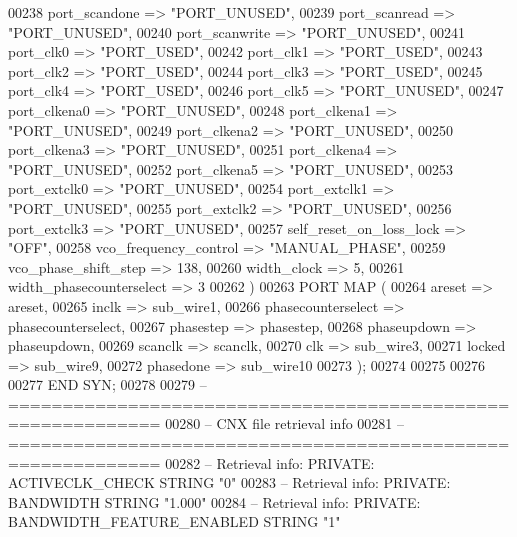 \begin{DoxyCode}
{00238         port\_scandone => \textcolor{keyword}{"PORT\_UNUSED"},
00239         port\_scanread => \textcolor{keyword}{"PORT\_UNUSED"},
00240         port\_scanwrite => \textcolor{keyword}{"PORT\_UNUSED"},
00241         port\_clk0 => \textcolor{keyword}{"PORT\_USED"},
00242         port\_clk1 => \textcolor{keyword}{"PORT\_USED"},
00243         port\_clk2 => \textcolor{keyword}{"PORT\_USED"},
00244         port\_clk3 => \textcolor{keyword}{"PORT\_USED"},
00245         port\_clk4 => \textcolor{keyword}{"PORT\_USED"},
00246         port\_clk5 => \textcolor{keyword}{"PORT\_UNUSED"},
00247         port\_clkena0 => \textcolor{keyword}{"PORT\_UNUSED"},
00248         port\_clkena1 => \textcolor{keyword}{"PORT\_UNUSED"},
00249         port\_clkena2 => \textcolor{keyword}{"PORT\_UNUSED"},
00250         port\_clkena3 => \textcolor{keyword}{"PORT\_UNUSED"},
00251         port\_clkena4 => \textcolor{keyword}{"PORT\_UNUSED"},
00252         port\_clkena5 => \textcolor{keyword}{"PORT\_UNUSED"},
00253         port\_extclk0 => \textcolor{keyword}{"PORT\_UNUSED"},
00254         port\_extclk1 => \textcolor{keyword}{"PORT\_UNUSED"},
00255         port\_extclk2 => \textcolor{keyword}{"PORT\_UNUSED"},
00256         port\_extclk3 => \textcolor{keyword}{"PORT\_UNUSED"},
00257         self\_reset\_on\_loss\_lock => \textcolor{keyword}{"OFF"},
00258         vco\_frequency\_control => \textcolor{keyword}{"MANUAL\_PHASE"},
00259         vco\_phase\_shift\_step => \textcolor{vhdllogic}{138},
00260         width\_clock => \textcolor{vhdllogic}{5},
00261         width\_phasecounterselect => \textcolor{vhdllogic}{3}
00262     \textcolor{vhdlchar}{)}
00263     \textcolor{keywordflow}{PORT} \textcolor{keywordflow}{MAP} (
00264         areset => areset,
00265         inclk => sub_wire1,
00266         phasecounterselect => phasecounterselect,
00267         phasestep => phasestep,
00268         phaseupdown => phaseupdown,
00269         scanclk => scanclk,
00270         clk => sub_wire3,
00271         locked => sub_wire9,
00272         phasedone => sub_wire10
00273     \textcolor{vhdlchar}{)};
00274 
00275 
00276 
00277 \textcolor{keywordflow}{END} \textcolor{vhdlchar}{SYN};
00278 
00279 \textcolor{keyword}{-- ============================================================}
00280 \textcolor{keyword}{-- CNX file retrieval info}
00281 \textcolor{keyword}{-- ============================================================}
00282 \textcolor{keyword}{-- Retrieval info: PRIVATE: ACTIVECLK\_CHECK STRING "0"}
00283 \textcolor{keyword}{-- Retrieval info: PRIVATE: BANDWIDTH STRING "1.000"}
00284 \textcolor{keyword}{-- Retrieval info: PRIVATE: BANDWIDTH\_FEATURE\_ENABLED STRING "1"}
}
\end{DoxyCode}
